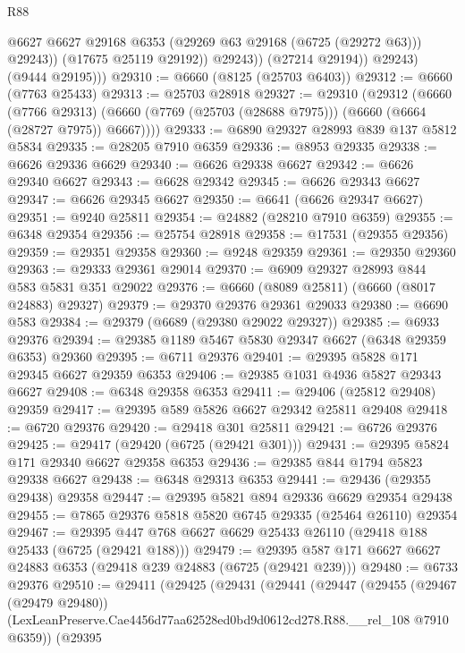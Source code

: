 \begin{lexlean}{R88}
\begin{coremodule}
                      @6627
                      @6627
                      @29168
                      @6353
                      (@29269 @63 @29168 (@6725 (@29272 @63)))
                      @29243))
                  (@17675 @25119 @29192))
                @29243))
            (@27214 @29194))
          @29243)
        (@9444 @29195)))
@29310 := @6660 (@8125 (@25703 @6403))
@29312 := @6660 (@7763 @25433)
@29313 := @25703 @28918
@29327 := @29310
    (@29312
      (@6660
        (@7766 @29313)
        (@6660 (@7769 (@25703 (@28688 @7975))) (@6660 (@6664 (@28727 @7975)) @6667))))
@29333 := @6890 @29327 @28993 @839 @137 @5812 @5834
@29335 := @28205 @7910 @6359
@29336 := @8953 @29335
@29338 := @6626 @29336 @6629
@29340 := @6626 @29338 @6627
@29342 := @6626 @29340 @6627
@29343 := @6628 @29342
@29345 := @6626 @29343 @6627
@29347 := @6626 @29345 @6627
@29350 := @6641 (@6626 @29347 @6627)
@29351 := @9240 @25811
@29354 := @24882 (@28210 @7910 @6359)
@29355 := @6348 @29354
@29356 := @25754 @28918
@29358 := @17531 (@29355 @29356)
@29359 := @29351 @29358
@29360 := @9248 @29359
@29361 := @29350 @29360
@29363 := @29333 @29361 @29014
@29370 := @6909 @29327 @28993 @844 @583 @5831 @351 @29022
@29376 := @6660 (@8089 @25811) (@6660 (@8017 @24883) @29327)
@29379 := @29370 @29376 @29361 @29033
@29380 := @6690 @583
@29384 := @29379 (@6689 (@29380 @29022 @29327))
@29385 := @6933 @29376
@29394 := @29385 @1189 @5467 @5830 @29347 @6627 (@6348 @29359 @6353) @29360
@29395 := @6711 @29376
@29401 := @29395 @5828 @171 @29345 @6627 @29359 @6353
@29406 := @29385 @1031 @4936 @5827 @29343 @6627
@29408 := @6348 @29358 @6353
@29411 := @29406 (@25812 @29408) @29359
@29417 := @29395 @589 @5826 @6627 @29342 @25811 @29408
@29418 := @6720 @29376
@29420 := @29418 @301 @25811
@29421 := @6726 @29376
@29425 := @29417 (@29420 (@6725 (@29421 @301)))
@29431 := @29395 @5824 @171 @29340 @6627 @29358 @6353
@29436 := @29385 @844 @1794 @5823 @29338 @6627
@29438 := @6348 @29313 @6353
@29441 := @29436 (@29355 @29438) @29358
@29447 := @29395 @5821 @894 @29336 @6629 @29354 @29438
@29455 := @7865 @29376 @5818 @5820 @6745 @29335 (@25464 @26110) @29354
@29467 := @29395 @447 @768 @6627 @6629 @25433 @26110 (@29418 @188 @25433 (@6725 (@29421 @188)))
@29479 := @29395 @587 @171 @6627 @6627 @24883 @6353 (@29418 @239 @24883 (@6725 (@29421 @239)))
@29480 := @6733 @29376
@29510 := @29411
    (@29425
      (@29431
        (@29441
          (@29447
            (@29455
              (@29467 (@29479 @29480))
              (LexLeanPreserve.Cae4456d77aa62528ed0bd9d0612cd278.R88.__rel_108 @7910 @6359))
            (@29395

\end{coremodule}
\end{lexlean}
